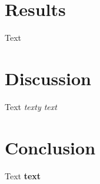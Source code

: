 \documentclass[screen,review]{acmart}
\begin{document}
\section{Results}
Text
\section{Discussion}
Text \textit{texty text}%
\section{Conclusion}
Text \textbf{text}

\end{document}
